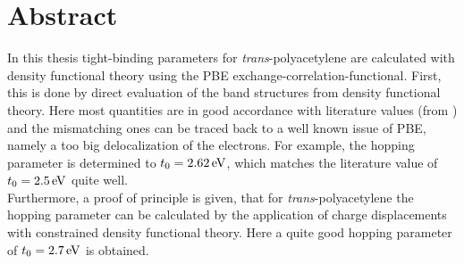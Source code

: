 \chapter*{Abstract}
In this thesis tight-binding parameters for \emph{trans}-polyacetylene are calculated with density functional theory using the PBE exchange-correlation-functional. First, this is done by direct evaluation of the band structures from density functional theory. Here most quantities are in good accordance with literature values (from \cite{PhysRevLett.42.1698, doi:10.1021/cr990357p}) and the mismatching ones can be traced back to a well known issue of PBE, namely a too big delocalization of the electrons. For example, the hopping parameter is determined to $t_0 = \unit[2.62]{eV}$, which matches the literature value of $t_0 = \unit[2.5]{eV}$ quite well.\\
Furthermore, a proof of principle is given, that for \emph{trans}-polyacetylene the hopping parameter can be calculated by the application of charge displacements with constrained density functional theory. Here a quite good hopping parameter of $t_0 = \unit[2.7]{eV}$ is obtained.

